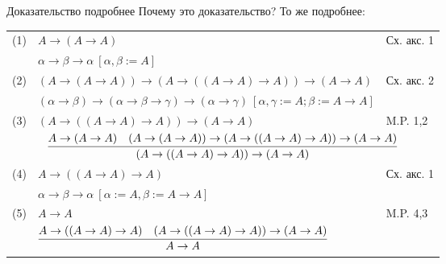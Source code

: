 \documentclass[handout]{beamer}
\begin{document}
\begin{frame}{Доказательство подробнее}
Почему это доказательство? То же подробнее:\pause\vspace{0.2cm}

\begin{tabular}{lll}
(1) & $A \rightarrow (A \rightarrow A)$&Сх. акс. 1\\
    & {\color{cyan}$\alpha \rightarrow \beta \rightarrow \alpha\ [\alpha, \beta := A]$}

\vspace{0.2cm}\\\pause

(2) & $(A \rightarrow (A \rightarrow A)) \rightarrow 
  (A \rightarrow ((A \rightarrow A) \rightarrow A)) \rightarrow
  (A \rightarrow A)$&Сх. акс. 2\\
    & {\color{cyan}$(\alpha \rightarrow \beta) \rightarrow (\alpha \rightarrow \beta \rightarrow \gamma) 
       \rightarrow (\alpha \rightarrow \gamma)\ [\alpha, \gamma := A; \beta := A\rightarrow A]$}

\vspace{0.2cm}\\\pause

(3) & $(A \rightarrow ((A \rightarrow A) \rightarrow A)) \rightarrow
  (A \rightarrow A)$&M.P. 1,2\\
    \multicolumn{3}{c}{\color{cyan} $\infer{(A \rightarrow ((A \rightarrow A) \rightarrow A)) \rightarrow
  (A \rightarrow A)}{A \rightarrow (A \rightarrow A) & (A \rightarrow (A \rightarrow A)) \rightarrow 
  (A \rightarrow ((A \rightarrow A) \rightarrow A)) \rightarrow
  (A \rightarrow A)}$}

\vspace{0.2cm}\\\pause

(4) & $A \rightarrow ((A \rightarrow A) \rightarrow A)$ & Сх. акс. 1\\
    & {\color{cyan}$\alpha \rightarrow \beta \rightarrow \alpha\ [\alpha := A, \beta := A\rightarrow A]$}

\vspace{0.2cm}\\\pause

(5) & $A \rightarrow A$ & M.P. 4,3\\
    & {\color{cyan} $\infer{A \rightarrow A}{A \rightarrow ((A \rightarrow A) \rightarrow A) & 
       (A \rightarrow ((A \rightarrow A) \rightarrow A)) \rightarrow (A \rightarrow A)}$}

\vspace{0.2cm}
\end{tabular}
\end{frame}
\end{document}
